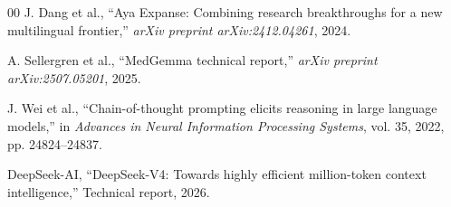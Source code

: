\documentclass[conference]{IEEEtran}
\begin{document}
\begin{thebibliography}{00}
J. Dang et al., ``Aya Expanse: Combining research breakthroughs for a new multilingual frontier,'' \emph{arXiv preprint arXiv:2412.04261}, 2024.


A. Sellergren et al., ``MedGemma technical report,'' \emph{arXiv preprint arXiv:2507.05201}, 2025.


J. Wei et al., ``Chain-of-thought prompting elicits reasoning in large language models,'' in \emph{Advances in Neural Information Processing Systems}, vol. 35, 2022, pp. 24824--24837.


DeepSeek-AI, ``DeepSeek-V4: Towards highly efficient million-token context intelligence,'' Technical report, 2026.

\end{thebibliography}
\end{document}
